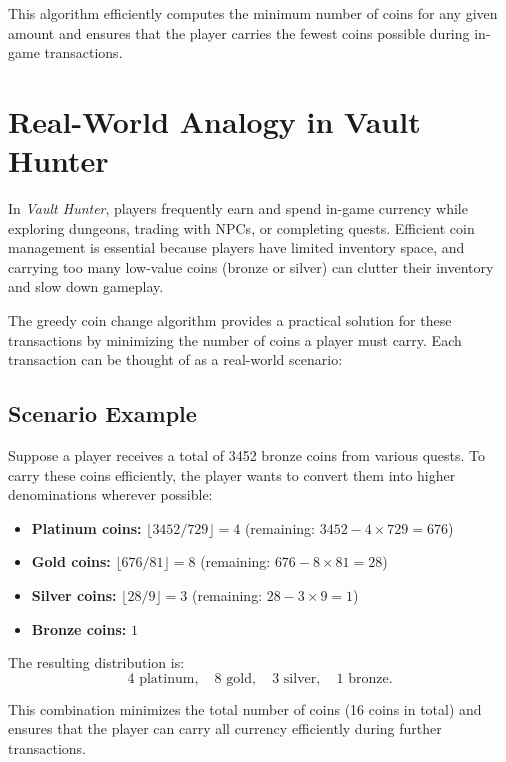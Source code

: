 \documentclass[12pt,a4paper]{report}
\begin{document}
\noindent This algorithm efficiently computes the minimum number of coins for any given amount and ensures that the player carries the fewest coins possible during in-game transactions.

\section{Real-World Analogy in Vault Hunter}

In \textit{Vault Hunter}, players frequently earn and spend in-game currency while exploring dungeons, trading with NPCs, or completing quests. Efficient coin management is essential because players have limited inventory space, and carrying too many low-value coins (bronze or silver) can clutter their inventory and slow down gameplay.  

The greedy coin change algorithm provides a practical solution for these transactions by minimizing the number of coins a player must carry. Each transaction can be thought of as a real-world scenario:

\subsection{Scenario Example}

Suppose a player receives a total of 3452 bronze coins from various quests. To carry these coins efficiently, the player wants to convert them into higher denominations wherever possible:

\begin{itemize}
    \item \textbf{Platinum coins:} $\lfloor 3452 / 729 \rfloor = 4$ (remaining: $3452 - 4 \times 729 = 676$)  
    \item \textbf{Gold coins:} $\lfloor 676 / 81 \rfloor = 8$ (remaining: $676 - 8 \times 81 = 28$)  
    \item \textbf{Silver coins:} $\lfloor 28 / 9 \rfloor = 3$ (remaining: $28 - 3 \times 9 = 1$)  
    \item \textbf{Bronze coins:} $1$  
\end{itemize}

\noindent The resulting distribution is:
\[
4 \text{ platinum}, \quad 8 \text{ gold}, \quad 3 \text{ silver}, \quad 1 \text{ bronze.}
\]

This combination minimizes the total number of coins (16 coins in total) and ensures that the player can carry all currency efficiently during further transactions.
\end{document}
